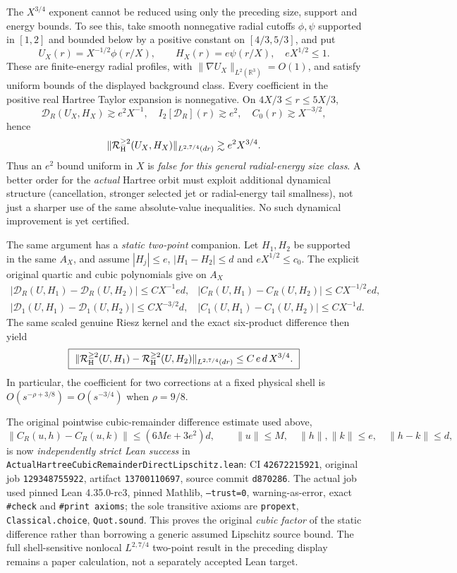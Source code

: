 \documentclass[11pt]{amsart}
\begin{document}
The $X^{3/4}$ exponent cannot be reduced using only the preceding
size, support and energy bounds.  To see this, take smooth nonnegative
radial cutoffs $\phi,\psi$ supported in $[1,2]$ and bounded below
by a positive constant on $[4/3,5/3]$, and put
\[
 U_X(r)=X^{-1/2}\phi(r/X),\qquad
 H_X(r)=e\psi(r/X),\quad eX^{1/2}\le1.
\]
These are finite-energy radial profiles, with
$\|\nabla U_X\|_{L^2(\mathbb R^3)}=O(1)$,
and satisfy uniform bounds of the displayed background class.
Every coefficient in the positive real Hartree Taylor expansion is
nonnegative.  On $4X/3\le r\le5X/3$,
\[
 \mathcal D_R(U_X,H_X)\gtrsim e^2X^{-1},
 \quad I_2[\mathcal D_R](r)\gtrsim e^2,
 \quad C_0(r)\gtrsim X^{-3/2},
\]
hence
\[
 \|\mathcal R_{\rm H}^{\ge2}(U_X,H_X)\|_{L^{2,7/4}(dr)}
 \gtrsim e^2X^{3/4}.
\]
Thus an $e^2$ bound uniform in $X$ is \emph{false for this
general radial-energy size class}. A better order for the
\emph{actual} Hartree orbit must exploit additional dynamical
structure (cancellation, stronger selected jet or radial-energy tail
smallness), not just a sharper use of the same absolute-value
inequalities.  No such dynamical improvement is yet certified.

The same argument has a \emph{static two-point} companion.
Let $H_1,H_2$ be supported in the same $A_X$, and assume
$|H_j|\le e$, $|H_1-H_2|\le d$ and $eX^{1/2}\le c_0$.
The explicit original quartic and cubic polynomials give on $A_X$
\[
 \begin{array}{ll}
 |\mathcal D_R(U,H_1)-\mathcal D_R(U,H_2)|
       \le C X^{-1}ed,&
 |C_R(U,H_1)-C_R(U,H_2)|
       \le C X^{-1/2}ed,\\
 |\mathcal D_1(U,H_1)-\mathcal D_1(U,H_2)|
       \le C X^{-3/2}d,&
 |C_1(U,H_1)-C_1(U,H_2)|
       \le C X^{-1}d.
 \end{array}
\]
The same scaled genuine Riesz kernel and the exact six-product
difference then yield
\[
 \boxed{\ 
 \|\mathcal R_{\rm H}^{\ge2}(U,H_1)-
   \mathcal R_{\rm H}^{\ge2}(U,H_2)\|_{L^{2,7/4}(dr)}
 \le C\,e\,d\,X^{3/4}.\ }
\]
In particular, the coefficient for two corrections at a fixed
physical shell is $O(s^{-\rho+3/8})=O(s^{-3/4})$
when $\rho=9/8$.

The original pointwise cubic-remainder difference estimate used above,
\[
 \bigl\|C_R(u,h)-C_R(u,k)\bigr\|
 \le (6Me+3e^2)d,\qquad
 \|u\|\le M,\quad \|h\|,\|k\|\le e,\quad
 \|h-k\|\le d,
\]
is now \emph{independently strict Lean success} in
\texttt{ActualHartreeCubicRemainderDirectLipschitz.lean}:
CI \texttt{42672215921}, original job \texttt{129348755922},
artifact \texttt{13700110697}, source commit \texttt{d870286}.
The actual job used pinned Lean 4.35.0-rc3, pinned Mathlib,
\texttt{--trust=0}, warning-as-error, exact \texttt{\#check}
and \texttt{\#print axioms}; the sole transitive axioms are
\texttt{propext}, \texttt{Classical.choice}, \texttt{Quot.sound}.
This proves the original \emph{cubic factor} of the static
difference rather than borrowing a generic assumed Lipschitz
source bound.  The full shell-sensitive nonlocal \(L^{2,7/4}\)
two-point result in the preceding display remains a paper
calculation, not a separately accepted Lean target.
\end{document}
